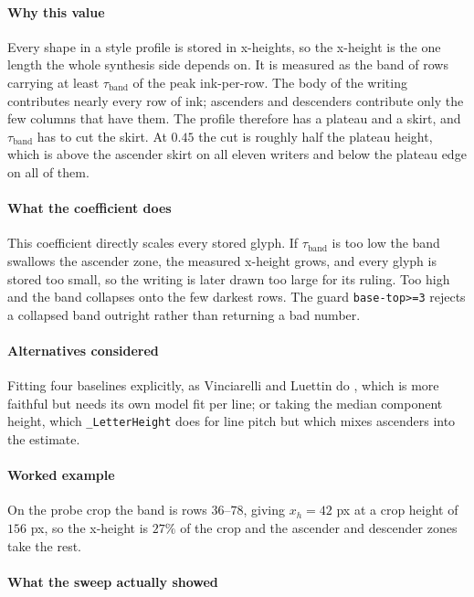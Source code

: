 \paragraph{Why this value}

Every shape in a style profile is stored in x-heights, so the x-height is the one length the whole synthesis side depends on. It is measured as the band of rows carrying at least $\tau_{\text{band}}$ of the peak ink-per-row. The body of the writing contributes nearly every row of ink; ascenders and descenders contribute only the few columns that have them. The profile therefore has a plateau and a skirt, and $\tau_{\text{band}}$ has to cut the skirt. At $0.45$ the cut is roughly half the plateau height, which is above the ascender skirt on all eleven writers and below the plateau edge on all of them.

\paragraph{What the coefficient does}

This coefficient directly scales every stored glyph. If $\tau_{\text{band}}$ is too low the band swallows the ascender zone, the measured x-height grows, and every glyph is stored too small, so the writing is later drawn too large for its ruling. Too high and the band collapses onto the few darkest rows. The guard \texttt{base-top>=3} rejects a collapsed band outright rather than returning a bad number.

\paragraph{Alternatives considered}

Fitting four baselines explicitly, as Vinciarelli and Luettin do \cite{vinciarelli2001}, which is more faithful but needs its own model fit per line; or taking the median component height, which \texttt{\_LetterHeight} does for line pitch but which mixes ascenders into the estimate.

\paragraph{Worked example}

On the probe crop the band is rows $36$--$78$, giving $x_h = 42$ px at a crop height of $156$ px, so the x-height is $27\%$ of the crop and the ascender and descender zones take the rest.

\paragraph{What the sweep actually showed}

